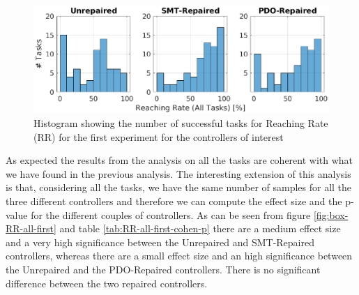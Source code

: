 \begin{figure}[H]
    \centering
    \includegraphics[width=\textwidth]{Images/first-experiment/exp0_RR_all_hist.eps}
    \caption{Histogram showing the number of successful tasks for Reaching Rate (RR) for the first experiment for the controllers of interest}
    \label{fig:hist-RR-all-first}
\end{figure}
As expected the results from the analysis on all the tasks are coherent with what we have found in the previous analysis. The interesting extension of this analysis is that, considering all the tasks, we have the same number of samples for all the three different controllers and therefore we can compute the effect size and the p-value for the different couples of controllers. As can be seen from figure \ref{fig:box-RR-all-first} and table \ref{tab:RR-all-first-cohen-p} there are a medium effect size and a very high significance between the Unrepaired and SMT-Repaired controllers, whereas there are a small effect size and an high significance between the Unrepaired and the PDO-Repaired controllers. There is no significant difference between the two repaired controllers.
%
%
%
%
%
